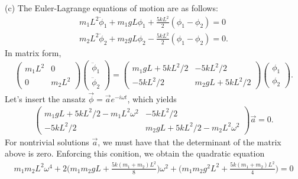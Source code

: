 {(c) The Euler-Lagrange equations of motion are as follows:
\begin{align}
    m_1 L^2 \ddot{\phi}_1 + m_1 g L \phi_1 + \frac{5 k L^2}{2} (\phi_1 - \phi_2) = 0 \\
    m_2 L^2 \ddot{\phi}_2 + m_2 g L \phi_2 - \frac{5 k L^2}{2} (\phi_1 - \phi_2) = 0
.\end{align}
In matrix form,
\begin{align}
    \begin{pmatrix}
        m_1 L^2 & 0 \\
        0 & m_2 L^2
    \end{pmatrix}
    \begin{pmatrix}
        \ddot{\phi}_1 \\ \ddot{\phi}_2
    \end{pmatrix}
    =
    \begin{pmatrix}
        m_1 g L + 5 k L^2/2 & - 5 k L^2/2 \\
        -5 k L^2 / 2 & m_2 g L + 5 k L^2 / 2
    \end{pmatrix}
    \begin{pmatrix}
        \phi_1 \\ \phi_2
    \end{pmatrix}
.\end{align}
Let's insert the ansatz $\vec{\phi} = \vec{a} e^{-i \omega t}$, which yields
\begin{align}
    \begin{pmatrix}
        m_1 g L + 5 k L^2/2 - m_1 L^2 \omega^2 & - 5 k L^2/2 \\
        -5 k L^2 / 2 & m_2 g L + 5 k L^2 / 2 - m_2 L^2 \omega^2
    \end{pmatrix}
    \vec{a} = 0
.\end{align}
For nontrivial solutions $\vec{a}$, we must have that the determinant of the matrix above is zero.
Enforcing this conition, we obtain the quadratic equation
\begin{align}
    m_1 m_2 L^2 \omega^4 + 2 \Big( m_1 m_2 g L + \frac{5 k (m_1 + m_2) L^2}{8} \Big) \omega^2 + \Big( m_1 m_2 g^2 L^2 + \frac{5 k (m_1 + m_2) L^2}{4} \Big) = 0
\end{align}

}
